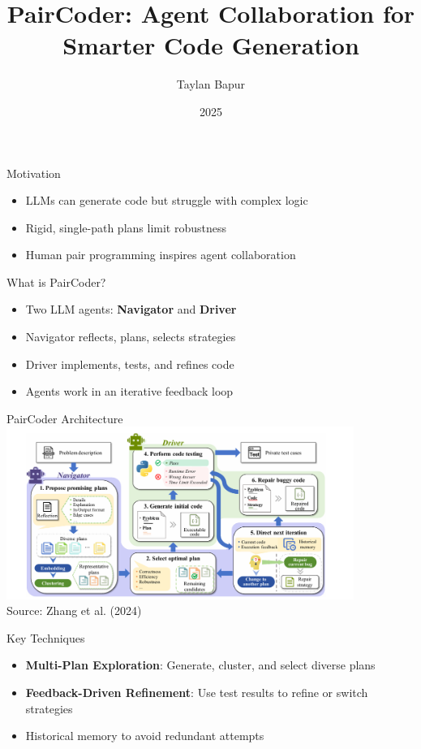 \documentclass{beamer}
\title{PairCoder: Agent Collaboration for Smarter Code Generation}
\author{Taylan Bapur}
\institute{Machine Learning in Software Engineering Seminar}
\date{2025}
\begin{document}
\frame{\titlepage}

\begin{frame}{Motivation}
\begin{itemize}
  \item LLMs can generate code but struggle with complex logic
  \item Rigid, single-path plans limit robustness
  \item Human pair programming inspires agent collaboration
\end{itemize}
\end{frame}

\begin{frame}{What is PairCoder?}
\begin{itemize}
  \item Two LLM agents: \textbf{Navigator} and \textbf{Driver}
  \item Navigator reflects, plans, selects strategies
  \item Driver implements, tests, and refines code
  \item Agents work in an iterative feedback loop
\end{itemize}
\end{frame}

\begin{frame}{PairCoder Architecture}
\centering
\includegraphics[width=0.85\textwidth]{paircoder-architecture.png} \\[0.5em]
\small Source: Zhang et al. (2024)
\end{frame}

\begin{frame}{Key Techniques}
\begin{itemize}
  \item \textbf{Multi-Plan Exploration}: Generate, cluster, and select diverse plans
  \item \textbf{Feedback-Driven Refinement}: Use test results to refine or switch strategies
  \item Historical memory to avoid redundant attempts
\end{itemize}
\end{frame}
\end{document}
